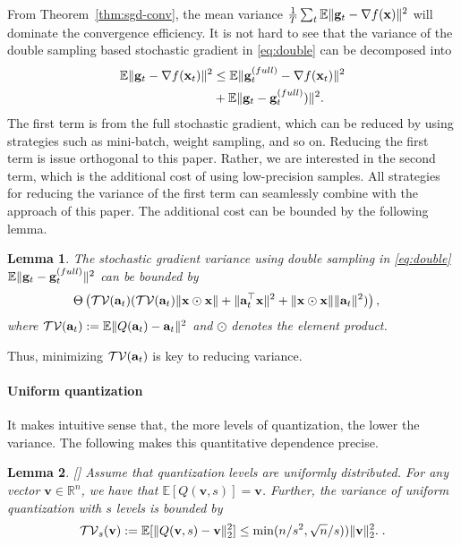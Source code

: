 \documentclass{article}
\newcommand{\R}{\mathbb{R}}
\renewcommand{\vec}[1]{\mathbf{#1}}
\def\a{{\bf a}}
\def\g{{\bf g}}
\def\x{{\bf x}}
\def\v{{\bf v}}
\def\E{\mathbb{E}}
\newtheorem{lemma}{Lemma}
\begin{document}
From Theorem~\ref{thm:sgd-conv}, the mean variance ${1\over T}\sum_{t}\E\|\g_t - \nabla f(\x)\|^2$ will dominate the convergence efficiency. It is not hard to see that the variance of the double sampling based stochastic gradient in \eqref{eq:double} can be decomposed into
\begin{align*}
\E\|\g_t - \nabla f(\x_t)\|^2 & \leq \E \|\g_t^{(full)}- \nabla f(\x_t)\|^2 
\\
&+ \E \|\g_t - \g_t^{(full)})\|^2.
\end{align*}
The first term is from the full stochastic gradient, which can be reduced by using strategies such as mini-batch, weight sampling, and so on. Reducing the first term is issue orthogonal to this paper. 
Rather, we are interested in the second term, which is the additional cost of using low-precision samples. All strategies for reducing the variance of the first term can seamlessly combine with the approach of this paper. 
The additional cost can be bounded by the following lemma.
\begin{lemma} 
The stochastic gradient variance using double sampling in \eqref{eq:double} $\E\|\g_t - \g_t^{(full)}\|^2$ can be bounded by
\begin{align*}
&\Theta\left(\mathcal{TV}(\a_t) (\mathcal{TV}(\a_t)\|\x\odot \x\| + \|\a_t^\top \x\|^2 + \|\x\odot \x\|\|\a_t\|^2)\right),
\end{align*}
where $\mathcal{TV}(\a_t) := \E\|Q(\a_t) - \a_t\|^2$ and $\odot$ denotes the element product.
\end{lemma}
Thus, minimizing $\mathcal{TV}(\a_t)$ is key to reducing variance. 

\paragraph{Uniform quantization} It makes intuitive sense that, the more levels of quantization, the lower the variance. The following  makes this quantitative dependence precise. 

\begin{lemma}
\label{lem:quant-facts} [\cite{Alistarh:2016:ArXiv}]
Assume that quantization levels are uniformly distributed. For any vector $\vec{v} \in \R^n$, we have that $\E [Q (\vec{v},s)] = \vec{v}$. Further, the variance of uniform quantization with $s$ levels is bounded by
\[
\mathcal{TV}_s(\v):=\E [\| Q (\vec{v},s) - \v\|_2^2] \leq \min( n/s^2,\sqrt{n}/s)) \| \vec{v} \|_2^2. \; .
\]
\end{lemma} 
\end{document}
